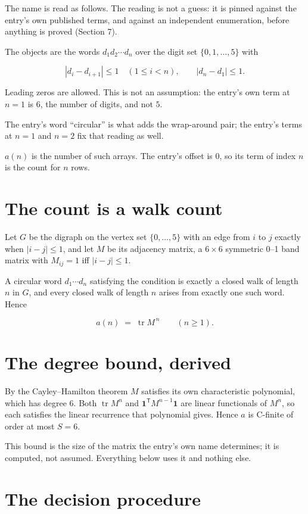 \documentclass[11pt]{article}
\theoremstyle{definition}
\begin{document}
The name is read as follows. The reading is not a guess: it is pinned against the entry's own published terms, and against an independent enumeration, before anything is proved (Section 7).

The objects are the words $d_1 d_2 \cdots d_n$ over the digit set $\{0,1,\dots,5\}$ with

\[|d_i - d_{i+1}| \le 1\quad (1 \le i < n), \qquad |d_n - d_1| \le 1.\]

Leading zeros are allowed. This is not an assumption: the entry's own term at $n=1$ is $6$, the number of digits, and not $5$.

The entry's word ``circular'' is what adds the wrap-around pair; the entry's terms at $n = 1$ and $n = 2$ fix that reading as well.

$a(n)$ is the number of such arrays. The entry's offset is 0, so its term of index $n$ is the count for $n$ rows.

\section{The count is a walk count}

Let $G$ be the digraph on the vertex set $\{0,\dots,5\}$ with an edge from $i$ to $j$ exactly when $|i-j| \le 1$, and let $M$ be its adjacency matrix, a $6 \times 6$ symmetric 0--1 band matrix with $M_{ij} = 1$ iff $|i-j| \le 1$.

A circular word $d_1\cdots d_n$ satisfying the condition is exactly a closed walk of length $n$ in $G$, and every closed walk of length $n$ arises from exactly one such word. Hence

\[a(n) \;=\; \operatorname{tr} M^{\,n} \qquad (n \ge 1).\]

\section{The degree bound, derived}

By the Cayley--Hamilton theorem $M$ satisfies its own characteristic polynomial, which has degree $6$. Both $\operatorname{tr} M^n$ and $\mathbf 1^{\mathsf T} M^{n-1} \mathbf 1$ are linear functionals of $M^{n}$, so each satisfies the linear recurrence that polynomial gives. Hence $a$ is C-finite of order at most $S = 6$.

This bound is the size of the matrix the entry's own name determines; it is computed, not assumed. Everything below uses it and nothing else.

\section{The decision procedure}
\end{document}
